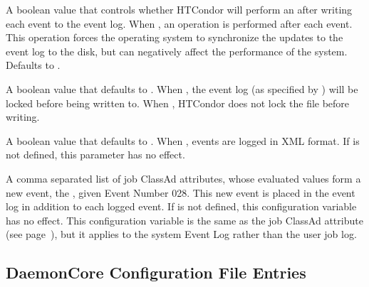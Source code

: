 \begin{description}
\label{param:EventLogFsync}
\item[\Macro{EVENT\_LOG\_FSYNC}]
  A boolean value that controls whether HTCondor will perform an
   after writing each event to the event log.
  When ,
  an  operation is performed after each event.
  This  operation forces the operating system to
  synchronize the updates to the event log to the disk, but can
  negatively affect the performance of the system.  
  Defaults to .

\label{param:EventLogLocking}
\item[\Macro{EVENT\_LOG\_LOCKING}]
  A boolean value that defaults to .
  When ,
  the event log (as specified by )
  will be locked before being written to.
  When , HTCondor does not lock the file before writing.

\label{param:EventLogUseXML}
\item[\Macro{EVENT\_LOG\_USE\_XML}]
  A boolean value that defaults to .
  When , events are logged in XML format.
  If  is not defined, this parameter has no effect.

\label{param:EventLogJobAdInformationAttrs}
\item[\Macro{EVENT\_LOG\_JOB\_AD\_INFORMATION\_ATTRS}]
  A comma separated list of job ClassAd attributes,
  whose evaluated values form a new event, the ,
  given Event Number 028.
  This new event is placed in the event log in addition to each logged event.
  If  is not defined, this configuration variable
  has no effect.
  This configuration variable is the same as the job ClassAd attribute
   (see
  page~\pageref{JobAdInformationAttrs-job-attribute}),
  but it applies to the system Event Log rather than the user job log.

\end{description}

\subsection{\label{sec:DaemonCore-Config-File-Entries}DaemonCore Configuration File Entries} 

